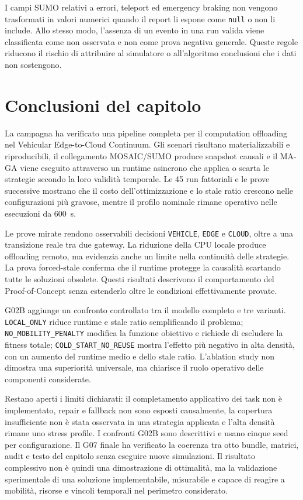 I campi SUMO relativi a errori, teleport ed emergency braking non vengono trasformati in valori numerici quando il report li espone come \texttt{null} o non li include. Allo stesso modo, l'assenza di un evento in una run valida viene classificata come non osservata e non come prova negativa generale. Queste regole riducono il rischio di attribuire al simulatore o all'algoritmo conclusioni che i dati non sostengono.

\section{Conclusioni del capitolo}
\label{sec:exp_conclusioni}

La campagna ha verificato una pipeline completa per il computation offloading nel Vehicular Edge-to-Cloud Continuum. Gli scenari risultano materializzabili e riproducibili, il collegamento MOSAIC/SUMO produce snapshot causali e il MA-GA viene eseguito attraverso un runtime asincrono che applica o scarta le strategie secondo la loro validità temporale. Le 45 run fattoriali e le prove successive mostrano che il costo dell'ottimizzazione e lo stale ratio crescono nelle configurazioni più gravose, mentre il profilo nominale rimane operativo nelle esecuzioni da 600~s.

Le prove mirate rendono osservabili decisioni \texttt{VEHICLE}, \texttt{EDGE} e \texttt{CLOUD}, oltre a una transizione reale tra due gateway. La riduzione della CPU locale produce offloading remoto, ma evidenzia anche un limite nella continuità delle strategie. La prova forced-stale conferma che il runtime protegge la causalità scartando tutte le soluzioni obsolete. Questi risultati descrivono il comportamento del Proof-of-Concept senza estenderlo oltre le condizioni effettivamente provate.

G02B aggiunge un confronto controllato tra il modello completo e tre varianti. \texttt{LOCAL\_ONLY} riduce runtime e stale ratio semplificando il problema; \texttt{NO\_MOBILITY\_PENALTY} modifica la funzione obiettivo e richiede di escludere la fitness totale; \texttt{COLD\_START\_NO\_REUSE} mostra l'effetto più negativo in alta densità, con un aumento del runtime medio e dello stale ratio. L'ablation study non dimostra una superiorità universale, ma chiarisce il ruolo operativo delle componenti considerate.

Restano aperti i limiti dichiarati: il completamento applicativo dei task non è implementato, repair e fallback non sono esposti causalmente, la copertura insufficiente non è stata osservata in una strategia applicata e l'alta densità rimane uno stress profile. I confronti G02B sono descrittivi e usano cinque seed per configurazione. Il G07 finale ha verificato la coerenza tra otto bundle, matrici, audit e testo del capitolo senza eseguire nuove simulazioni. Il risultato complessivo non è quindi una dimostrazione di ottimalità, ma la validazione sperimentale di una soluzione implementabile, misurabile e capace di reagire a mobilità, risorse e vincoli temporali nel perimetro considerato.
